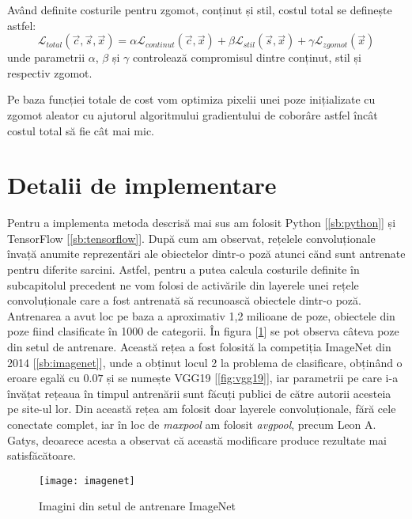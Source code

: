 Având definite costurile pentru zgomot, conținut și stil, costul total se definește astfel:
\begin{equation}
\label{eq:total_loss}
\mathcal{L}_{total}(\vec{c}, \vec{s}, \vec{x}) = \alpha \mathcal{L}_{continut}(\vec{c}, \vec{x}) + \beta \mathcal{L}_{stil}(\vec{s}, \vec{x}) + \gamma \mathcal{L}_{zgomot}(\vec{x})
\end{equation}
unde parametrii $\alpha$, $\beta$ și $\gamma$ controlează compromisul dintre conținut, stil și respectiv zgomot.

Pe baza funcției totale de cost vom optimiza pixelii unei poze inițializate cu zgomot aleator cu ajutorul algoritmului gradientului de coborâre astfel încât costul total să fie cât mai mic.

\section{Detalii de implementare}
Pentru a implementa metoda descrisă mai sus am folosit Python [\ref{sb:python}] și TensorFlow [\ref{sb:tensorflow}].
După cum am observat, rețelele convoluționale învață anumite reprezentări ale obiectelor dintr-o poză atunci cănd sunt antrenate pentru diferite sarcini. Astfel, pentru a putea calcula costurile definite în subcapitolul precedent ne vom folosi de activările din layerele unei rețele convoluționale care a fost antrenată să recunoască obiectele dintr-o poză. Antrenarea a avut loc pe baza a aproximativ 1,2 milioane de poze, obiectele din poze fiind clasificate în 1000 de categorii. În figura [\ref{fig:imagenet}] se pot observa câteva poze din setul de antrenare. Această rețea a fost folosită la competiția ImageNet din 2014 [\ref{sb:imagenet}], unde a obținut locul 2 la problema de clasificare, obținând o eroare egală cu $0.07$ și se numește VGG19 [\ref{fig:vgg19}], iar parametrii pe care i-a învățat rețeaua în timpul antrenării sunt făcuți publici de către autorii acesteia pe site-ul lor. \cite{parametri_vgg19} Din această rețea am folosit doar layerele convoluționale, fără cele conectate complet, iar în loc de \textit{maxpool} am folosit \textit{avgpool}, precum Leon A. Gatys, deoarece acesta a observat că această modificare produce rezultate mai satisfăcătoare.

\begin{figure}[H]
		\centering
        \texttt{[image: imagenet]}
        \caption{Imagini din setul de antrenare ImageNet}
        \label{fig:imagenet}
\end{figure}

